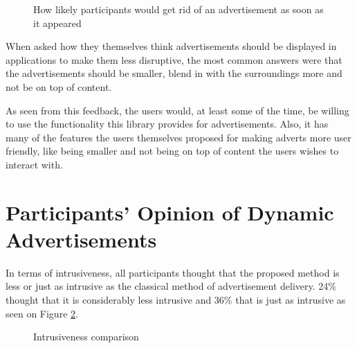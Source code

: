 \begin{figure}
\begin{center}
\caption{How likely participants would get rid of an advertisement as soon as it appeared}
\label{q7}
\end{center}
\end{figure}

When asked how they themselves think advertisements should be displayed in applications to make them less disruptive, the most common answers were that the advertisements should be smaller, blend in with the surroundings more and not be on top of content.

As seen from this feedback, the users would, at least some of the time, be willing to use the functionality this library provides for advertisements. Also, it has many of the features the users themselves proposed for making adverts more user friendly, like being smaller and not being on top of content the users wishes to interact with.

\section{Participants' Opinion of Dynamic Advertisements}

In terms of intrusiveness, all participants thought that the proposed method is less or just as intrusive as the classical method of advertisement delivery. 24\% thought that it is considerably less intrusive and 36\% that is just as intrusive as seen on Figure \ref{q8}.

\begin{figure}
\begin{center}
\caption{Intrusiveness comparison}
\label{q8}
\end{center}
\end{figure}

